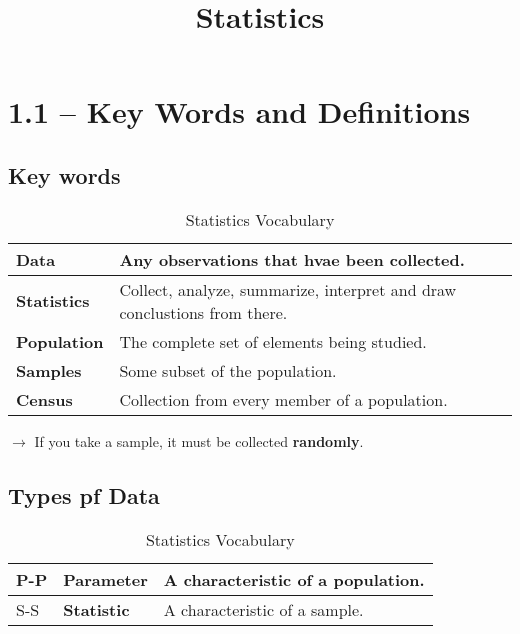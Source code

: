 \documentclass{book}
\title{Statistics}
\author{}
\date{}
\begin{document}
\maketitle
\tableofcontents


\chapter{1.1 -- Key Words and Definitions}

\section{Key words}

\begin{table}[htbp]
  \centering
  \begin{tabular}{>{\bfseries}l l}
      \toprule
      Data & Any observations that hvae been collected. \\
      \midrule
      Statistics & Collect, analyze, summarize, interpret and draw conclustions from there. \\
      \midrule
      Population & The complete set of elements being studied. \\
      \midrule
      Samples & Some subset of the population.\\
      \midrule
      Census & Collection from every member of a population. \\
      \bottomrule
  \end{tabular}
  \caption{Statistics Vocabulary}
  \label{tab:vocab}
\end{table}

$\to$ If you take a sample, it must be collected \textbf{randomly}.

\section{Types pf Data}

\begin{table}[htbp]
  \centering
  \begin{tabular}{l |>{\bfseries}l l}
      \toprule
      P-P & Parameter & A characteristic of a population. \\
      \midrule
      S-S & Statistic & A characteristic of a sample. \\
      \bottomrule
  \end{tabular}
  \caption{Statistics Vocabulary}
  \label{tab:vocab-2}
\end{table}
\end{document}
